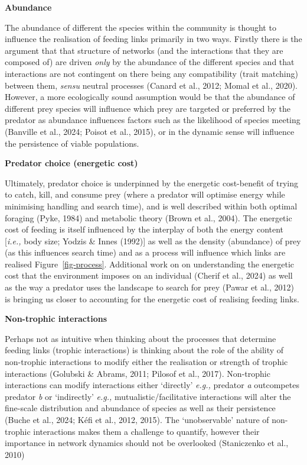 \documentclass[
]{article}
\begin{document}
\textbf{Abundance}

The abundance of different the species within the community is thought
to influence the realisation of feeding links primarily in two ways.
Firstly there is the argument that that structure of networks (and the
interactions that they are composed of) are driven \emph{only} by the
abundance of the different species and that interactions are not
contingent on there being any compatibility (trait matching) between
them, \emph{sensu} neutral processes (Canard et al., 2012; Momal et al.,
2020). However, a more ecologically sound assumption would be that the
abundance of different prey species will influence which prey are
targeted or preferred by the predator as abundance influences factors
such as the likelihood of species meeting (Banville et al., 2024; Poisot
et al., 2015), or in the dynamic sense will influence the persistence of
viable populations.

\textbf{Predator choice (energetic cost)}

Ultimately, predator choice is underpinned by the energetic cost-benefit
of trying to catch, kill, and consume prey (where a predator will
optimise energy while minimising handling and search time), and is well
described within both optimal foraging (Pyke, 1984) and metabolic theory
(Brown et al., 2004). The energetic cost of feeding is itself influenced
by the interplay of both the energy content {[}\emph{i.e.,} body size;
Yodzis \& Innes (1992){]} as well as the density (abundance) of prey (as
this influences search time) and as a process will influence which links
are realised Figure~\ref{fig-process}. Additional work on on
understanding the energetic cost that the environment imposes on an
individual (Cherif et al., 2024) as well as the way a predator uses the
landscape to search for prey (Pawar et al., 2012) is bringing us closer
to accounting for the energetic cost of realising feeding links.

\textbf{Non-trophic interactions}

Perhaps not as intuitive when thinking about the processes that
determine feeding links (trophic interactions) is thinking about the
role of the ability of non-trophic interactions to modify either the
realisation or strength of trophic interactions (Golubski \& Abrams,
2011; Pilosof et al., 2017). Non-trophic interactions can modify
interactions either `directly' \emph{e.g.,} predator \emph{a}
outcompetes predator \emph{b} or `indirectly' \emph{e.g.,}
mutualistic/facilitative interactions will alter the fine-scale
distribution and abundance of species as well as their persistence
(Buche et al., 2024; Kéfi et al., 2012, 2015). The `unobservable' nature
of non-trophic interactions makes them a challenge to quantify, however
their importance in network dynamics should not be overlooked
(Staniczenko et al., 2010)
\end{document}
